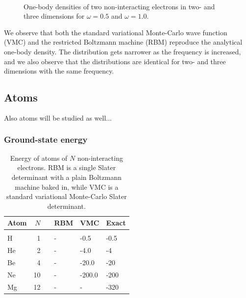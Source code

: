 \begin{figure} [h]%
	\centering
	\\
	
	\caption{One-body densities of two non-interacting electrons in two- and three dimensions for $\omega=0.5$ and $\omega=1.0$.}%
	\label{fig:OB_nointeraction}
\end{figure}

We observe that both the standard variational Monte-Carlo wave function (VMC) and the restricted Boltzmann machine (RBM) reproduce the analytical one-body density. The distribution gets narrower as the frequency is increased, and we also observe that the distributions are identical for two- and three dimensions with the same frequency.

\newpage
\subsection{Atoms}
Also atoms will be studied as well...

\subsubsection{Ground-state energy}
\begin{table} [H]
	\caption{Energy of atoms of $N$ non-interacting electrons. RBM is a single Slater determinant with a plain Boltzmann machine baked in, while VMC is a standard variational Monte-Carlo Slater determinant.}
	\label{tab:atomswointeraction}
	\begin{tabularx}{\textwidth}{lrrR{3.5cm}R{3.5cm}R{3.5cm}} \hline\hline
		Atom & $N$ & \makecell{\\ \phantom{=}} & RBM & VMC & Exact \\ \hline \\
		
		H & 1 && - & -0.5 & -0.5 \\
		He & 2 && - & -4.0 & -4 \\
		Be & 4 && - & -20.0 & -20 \\
		Ne & 10 && - & -200.0 & -200\\
		Mg & 12 && - & - & -320 \\ \hline\hline
	\end{tabularx}
\end{table}

